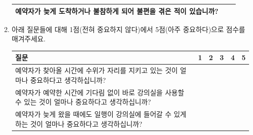 \documentclass[11pt,a4paper]{article}
\begin{document}
\begin{enumerate}
\begin{tabular}{ | l | c | c | }
\hline
예약자가 늦게 도착하거나 불참하게 되어 불편을 겪은 적이 있습니까? & & \\
\hline
\end{tabular}
\item 아래 질문들에 대해 1점(전혀 중요하지 않다)에서 5점(아주 중요하다)으로 점수를 매겨주세요.\\
\begin{tabular}{ | p{12cm} | c | c | c | c | c | }
\hline
질문 & 1 & 2 & 3 & 4 & 5 \\
\hline
예약자가 찾아올 시간에 수위가 자리를 지키고 있는 것이 얼마나 중요하다고 생각하십니까? & & & & & \\
\hline
예약자가 예약한 시간에 기다림 없이 바로 강의실을 사용할 수 있는 것이 얼마나 중요하다고 생각하십니까? & & & & & \\
\hline
예약자가 늦게 왔을 때에도 일행이 강의실에 들어갈 수 있게 하는 것이 얼마나 중요하다고 생각하십니까? & & & & & \\
\hline
\end{tabular}
\end{enumerate}
\end{document}
